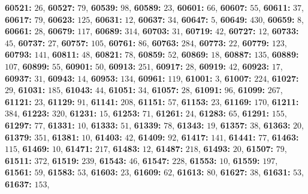 \textsf{\bfseries 60521:} $26$, \textsf{\bfseries 60527:} $79$, \textsf{\bfseries 60539:} $98$, \textsf{\bfseries 60589:} $23$, \textsf{\bfseries 60601:} $66$, \textsf{\bfseries 60607:} $55$, \textsf{\bfseries 60611:} $37$, \textsf{\bfseries 60617:} $79$, \textsf{\bfseries 60623:} $125$, \textsf{\bfseries 60631:} $12$, \textsf{\bfseries 60637:} $34$, \textsf{\bfseries 60647:} $5$, \textsf{\bfseries 60649:} $430$, \textsf{\bfseries 60659:} $8$, \textsf{\bfseries 60661:} $28$, \textsf{\bfseries 60679:} $117$, \textsf{\bfseries 60689:} $314$, \textsf{\bfseries 60703:} $31$, \textsf{\bfseries 60719:} $42$, \textsf{\bfseries 60727:} $12$, \textsf{\bfseries 60733:} $45$, \textsf{\bfseries 60737:} $27$, \textsf{\bfseries 60757:} $105$, \textsf{\bfseries 60761:} $86$, \textsf{\bfseries 60763:} $284$, \textsf{\bfseries 60773:} $22$, \textsf{\bfseries 60779:} $123$, \textsf{\bfseries 60793:} $141$, \textsf{\bfseries 60811:} $48$, \textsf{\bfseries 60821:} $78$, \textsf{\bfseries 60859:} $52$, \textsf{\bfseries 60869:} $18$, \textsf{\bfseries 60887:} $135$, \textsf{\bfseries 60889:} $107$, \textsf{\bfseries 60899:} $55$, \textsf{\bfseries 60901:} $50$, \textsf{\bfseries 60913:} $251$, \textsf{\bfseries 60917:} $28$, \textsf{\bfseries 60919:} $42$, \textsf{\bfseries 60923:} $17$, \textsf{\bfseries 60937:} $31$, \textsf{\bfseries 60943:} $14$, \textsf{\bfseries 60953:} $134$, \textsf{\bfseries 60961:} $119$, \textsf{\bfseries 61001:} $3$, \textsf{\bfseries 61007:} $224$, \textsf{\bfseries 61027:} $29$, \textsf{\bfseries 61031:} $185$, \textsf{\bfseries 61043:} $44$, \textsf{\bfseries 61051:} $34$, \textsf{\bfseries 61057:} $28$, \textsf{\bfseries 61091:} $96$, \textsf{\bfseries 61099:} $267$, \textsf{\bfseries 61121:} $23$, \textsf{\bfseries 61129:} $91$, \textsf{\bfseries 61141:} $208$, \textsf{\bfseries 61151:} $57$, \textsf{\bfseries 61153:} $23$, \textsf{\bfseries 61169:} $170$, \textsf{\bfseries 61211:} $384$, \textsf{\bfseries 61223:} $320$, \textsf{\bfseries 61231:} $15$, \textsf{\bfseries 61253:} $71$, \textsf{\bfseries 61261:} $24$, \textsf{\bfseries 61283:} $65$, \textsf{\bfseries 61291:} $155$, \textsf{\bfseries 61297:} $77$, \textsf{\bfseries 61331:} $10$, \textsf{\bfseries 61333:} $51$, \textsf{\bfseries 61339:} $78$, \textsf{\bfseries 61343:} $19$, \textsf{\bfseries 61357:} $38$, \textsf{\bfseries 61363:} $20$, \textsf{\bfseries 61379:} $351$, \textsf{\bfseries 61381:} $10$, \textsf{\bfseries 61403:} $42$, \textsf{\bfseries 61409:} $92$, \textsf{\bfseries 61417:} $141$, \textsf{\bfseries 61441:} $77$, \textsf{\bfseries 61463:} $115$, \textsf{\bfseries 61469:} $10$, \textsf{\bfseries 61471:} $217$, \textsf{\bfseries 61483:} $12$, \textsf{\bfseries 61487:} $218$, \textsf{\bfseries 61493:} $20$, \textsf{\bfseries 61507:} $79$, \textsf{\bfseries 61511:} $372$, \textsf{\bfseries 61519:} $239$, \textsf{\bfseries 61543:} $46$, \textsf{\bfseries 61547:} $228$, \textsf{\bfseries 61553:} $10$, \textsf{\bfseries 61559:} $197$, \textsf{\bfseries 61561:} $59$, \textsf{\bfseries 61583:} $53$, \textsf{\bfseries 61603:} $23$, \textsf{\bfseries 61609:} $62$, \textsf{\bfseries 61613:} $80$, \textsf{\bfseries 61627:} $38$, \textsf{\bfseries 61631:} $53$, \textsf{\bfseries 61637:} $153$, 
